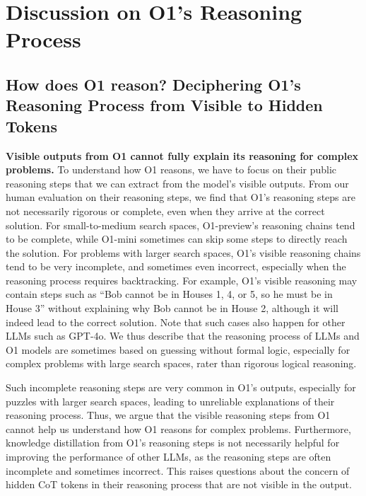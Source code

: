 \section{Discussion on O1's Reasoning Process}

\subsection{How does O1 reason? Deciphering O1's Reasoning Process from Visible to Hidden Tokens}

\textbf{Visible outputs from O1 cannot fully explain its reasoning for complex problems.}
To understand how O1 reasons, we have to focus on their public reasoning steps that we can extract from the model's visible outputs. 
From our human evaluation on their reasoning steps, we find that O1's reasoning steps are not necessarily rigorous or complete, even when they arrive at the correct solution.
For small-to-medium search spaces, O1-preview's reasoning chains tend to be complete, while O1-mini sometimes can skip some steps to directly reach the solution.
For problems with larger search spaces, O1's visible reasoning chains tend to be very incomplete, and sometimes even incorrect, especially when the reasoning process requires backtracking.
For example, O1's visible reasoning may contain steps such as ``Bob cannot be in Houses 1, 4, or 5, so he must be in House 3'' without explaining why Bob cannot be in House 2, although it will indeed lead to the correct solution. Note that such cases also happen for other LLMs such as GPT-4o. 
We thus describe that the reasoning process of LLMs and O1 models are sometimes based on guessing without formal logic, especially for complex problems with large search spaces, rater than rigorous logical reasoning.

Such incomplete reasoning steps are very common in O1's outputs, especially for puzzles with larger search spaces, leading to unreliable explanations of their reasoning process.
Thus, we argue that the visible reasoning steps from O1 cannot help us understand how O1 reasons for complex problems.
Furthermore, knowledge distillation from O1's reasoning steps is not necessarily helpful for improving the performance of other LLMs, as the reasoning steps are often incomplete and sometimes incorrect. This raises questions about the concern of hidden CoT tokens in their reasoning process that are not visible in the output.





